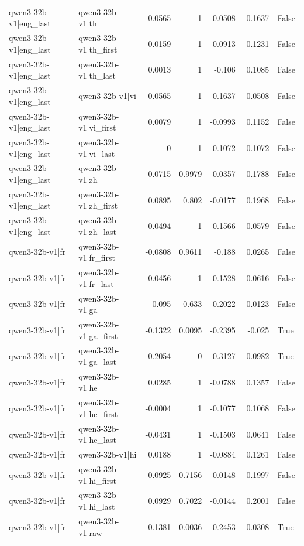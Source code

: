 \begin{table}
\begin{tabular}{l l r r r r l}
qwen3-32b-v1|eng_last & qwen3-32b-v1|th & 0.0565 & 1 & -0.0508 & 0.1637 & False \\
qwen3-32b-v1|eng_last & qwen3-32b-v1|th_first & 0.0159 & 1 & -0.0913 & 0.1231 & False \\
qwen3-32b-v1|eng_last & qwen3-32b-v1|th_last & 0.0013 & 1 & -0.106 & 0.1085 & False \\
qwen3-32b-v1|eng_last & qwen3-32b-v1|vi & -0.0565 & 1 & -0.1637 & 0.0508 & False \\
qwen3-32b-v1|eng_last & qwen3-32b-v1|vi_first & 0.0079 & 1 & -0.0993 & 0.1152 & False \\
qwen3-32b-v1|eng_last & qwen3-32b-v1|vi_last & 0 & 1 & -0.1072 & 0.1072 & False \\
qwen3-32b-v1|eng_last & qwen3-32b-v1|zh & 0.0715 & 0.9979 & -0.0357 & 0.1788 & False \\
qwen3-32b-v1|eng_last & qwen3-32b-v1|zh_first & 0.0895 & 0.802 & -0.0177 & 0.1968 & False \\
qwen3-32b-v1|eng_last & qwen3-32b-v1|zh_last & -0.0494 & 1 & -0.1566 & 0.0579 & False \\
qwen3-32b-v1|fr & qwen3-32b-v1|fr_first & -0.0808 & 0.9611 & -0.188 & 0.0265 & False \\
qwen3-32b-v1|fr & qwen3-32b-v1|fr_last & -0.0456 & 1 & -0.1528 & 0.0616 & False \\
qwen3-32b-v1|fr & qwen3-32b-v1|ga & -0.095 & 0.633 & -0.2022 & 0.0123 & False \\
qwen3-32b-v1|fr & qwen3-32b-v1|ga_first & -0.1322 & 0.0095 & -0.2395 & -0.025 & True \\
qwen3-32b-v1|fr & qwen3-32b-v1|ga_last & -0.2054 & 0 & -0.3127 & -0.0982 & True \\
qwen3-32b-v1|fr & qwen3-32b-v1|he & 0.0285 & 1 & -0.0788 & 0.1357 & False \\
qwen3-32b-v1|fr & qwen3-32b-v1|he_first & -0.0004 & 1 & -0.1077 & 0.1068 & False \\
qwen3-32b-v1|fr & qwen3-32b-v1|he_last & -0.0431 & 1 & -0.1503 & 0.0641 & False \\
qwen3-32b-v1|fr & qwen3-32b-v1|hi & 0.0188 & 1 & -0.0884 & 0.1261 & False \\
qwen3-32b-v1|fr & qwen3-32b-v1|hi_first & 0.0925 & 0.7156 & -0.0148 & 0.1997 & False \\
qwen3-32b-v1|fr & qwen3-32b-v1|hi_last & 0.0929 & 0.7022 & -0.0144 & 0.2001 & False \\
qwen3-32b-v1|fr & qwen3-32b-v1|raw & -0.1381 & 0.0036 & -0.2453 & -0.0308 & True \\

\end{tabular}
\end{table}
